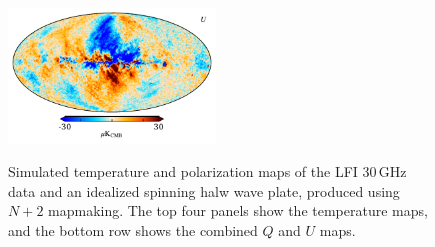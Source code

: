 \documentclass{aa}
\begin{document}
\begin{figure}
  \includegraphics[width=0.49\textwidth]{figs/sim_U.pdf}\\
  \caption{Simulated temperature and polarization maps of the LFI 30\,GHz data and an idealized spinning halw wave plate, produced using $N+2$ mapmaking. The top four panels show the temperature maps, and the bottom row shows the combined $Q$ and $U$ maps.}
  \label{fig:sim}
\end{figure}
\end{document}

